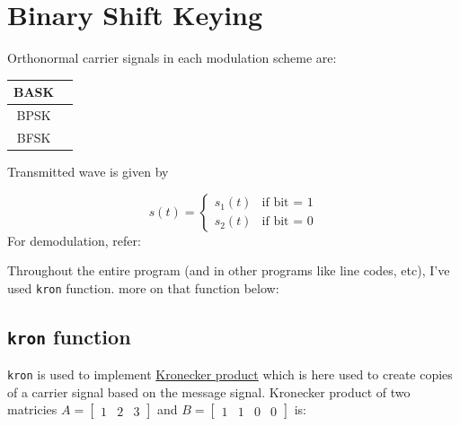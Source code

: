 \chapter{Binary Shift Keying}

Orthonormal carrier signals in each modulation scheme are: \\[10pt]

\newcommand{\se}{\sqrt{\dfrac{2E_b}{T_b}}}

\begin{center}
	\begin{tabular}{|c|c|}
\hline
BASK & \makecell{$\begin{aligned}
s_1(t) &= \se \cos(2\pi f_c t) \\[10pt]
s_2(t) &= 0
\end{aligned}$} \\ \hline
BPSK & \makecell{$\begin{aligned}
	s_1(t) &= \se \cos(2\pi f_c t) \\[10pt]
	s_2(t) &= \se \cos(2\pi f_c t + \pi)
\end{aligned}$} \\ \hline
BFSK & \makecell{$\begin{aligned}
	s_1(t) &= \se \cos(2\pi f_{c1} t) \\[10pt]
	s_2(t) &= \se \cos(2\pi f_{c2} t)
\end{aligned}$} \\ \hline
\end{tabular}
\end{center}
Transmitted wave is given by

\begin{equation*}
s(t) = \begin{cases}
		s_1(t)  &  \text{if bit = 1} \\
		s_2(t)  &  \text{if bit = 0}
	\end{cases}
\end{equation*}
For demodulation, refer: 

Throughout the entire program (and in other programs like line codes, etc), I've used \texttt{kron} function. more on that function below:
\section*{\texttt{kron} function \label{kronfx}}
\texttt{kron} is used to implement \href{https://en.wikipedia.org/wiki/Kronecker_product}{Kronecker product} which is here used to create copies of a carrier signal based on the message signal.
Kronecker product of two matricies $A = \begin{bmatrix}1 & 2 & 3\end{bmatrix}$ and $B = \begin{bmatrix}1 & 1 & 0 & 0\end{bmatrix}$ is:

